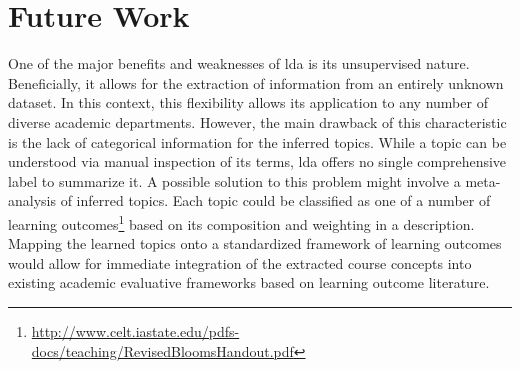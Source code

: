 \section{Future Work}
\label{sec:future-work}


One of the major benefits and weaknesses of \ac{lda} is its unsupervised nature.
Beneficially, it allows for the extraction of information from an entirely unknown dataset.
In this context, this flexibility allows its application to any number of diverse academic departments.
However, the main drawback of this characteristic is the lack of categorical information for the inferred topics.
While a topic can be understood via manual inspection of its terms, \ac{lda} offers no single comprehensive label to summarize it.
A possible solution to this problem might involve a meta-analysis of inferred topics.
Each topic could be classified as one of a number of learning outcomes\footnote{\url{http://www.celt.iastate.edu/pdfs-docs/teaching/RevisedBloomsHandout.pdf}} based on its composition and weighting in a description.
Mapping the learned topics onto a standardized framework of learning outcomes \cite{krathwohl2002} would allow for immediate integration of the extracted course concepts into existing academic evaluative frameworks based on learning outcome literature.


